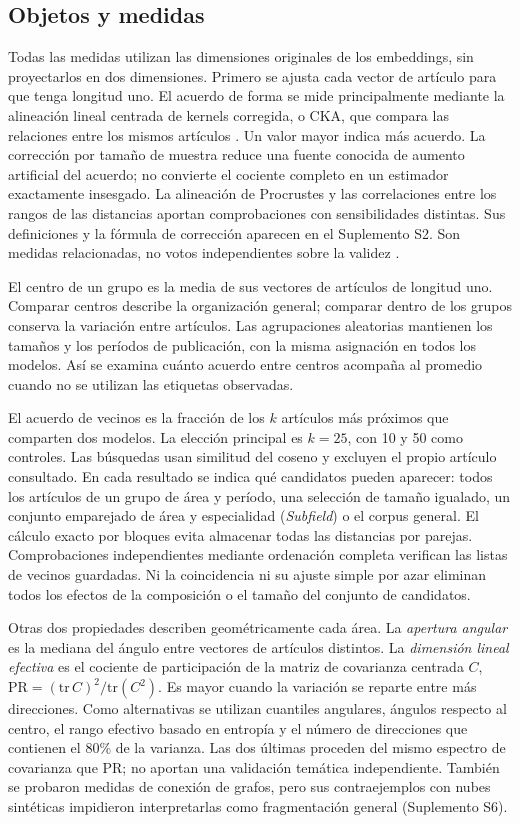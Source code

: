 \documentclass[12pt]{article}
\begin{document}
\subsection{Objetos y medidas}
Todas las medidas utilizan las dimensiones originales de los embeddings, sin proyectarlos en dos dimensiones. Primero se ajusta cada vector de artículo para que tenga longitud uno. El acuerdo de forma se mide principalmente mediante la alineación lineal centrada de kernels corregida, o CKA, que compara las relaciones entre los mismos artículos \citep{pmlr-v97-kornblith19a,refa961d84a4e}. Un valor mayor indica más acuerdo. La corrección por tamaño de muestra reduce una fuente conocida de aumento artificial del acuerdo; no convierte el cociente completo en un estimador exactamente insesgado. La alineación de Procrustes y las correlaciones entre los rangos de las distancias aportan comprobaciones con sensibilidades distintas. Sus definiciones y la fórmula de corrección aparecen en el Suplemento S2. Son medidas relacionadas, no votos independientes sobre la validez \citep{NEURIPS2021_252a3dba,pmlr-v285-williams24a}.

El centro de un grupo es la media de sus vectores de artículos de longitud uno. Comparar centros describe la organización general; comparar dentro de los grupos conserva la variación entre artículos. Las agrupaciones aleatorias mantienen los tamaños y los períodos de publicación, con la misma asignación en todos los modelos. Así se examina cuánto acuerdo entre centros acompaña al promedio cuando no se utilizan las etiquetas observadas.

El acuerdo de vecinos es la fracción de los $k$ artículos más próximos que comparten dos modelos. La elección principal es $k=25$, con 10 y 50 como controles. Las búsquedas usan similitud del coseno y excluyen el propio artículo consultado. En cada resultado se indica qué candidatos pueden aparecer: todos los artículos de un grupo de área y período, una selección de tamaño igualado, un conjunto emparejado de área y especialidad (\emph{Subfield}) o el corpus general. El cálculo exacto por bloques evita almacenar todas las distancias por parejas. Comprobaciones independientes mediante ordenación completa verifican las listas de vecinos guardadas. Ni la coincidencia ni su ajuste simple por azar eliminan todos los efectos de la composición o el tamaño del conjunto de candidatos.

Otras dos propiedades describen geométricamente cada área. La \emph{apertura angular} es la mediana del ángulo entre vectores de artículos distintos. La \emph{dimensión lineal efectiva} es el cociente de participación de la matriz de covarianza centrada $C$, $\mathrm{PR}=(\mathrm{tr}\,C)^2/\mathrm{tr}(C^2)$. Es mayor cuando la variación se reparte entre más direcciones. Como alternativas se utilizan cuantiles angulares, ángulos respecto al centro, el rango efectivo basado en entropía y el número de direcciones que contienen el 80\% de la varianza. Las dos últimas proceden del mismo espectro de covarianza que PR; no aportan una validación temática independiente. También se probaron medidas de conexión de grafos, pero sus contraejemplos con nubes sintéticas impidieron interpretarlas como fragmentación general (Suplemento S6).
\end{document}

